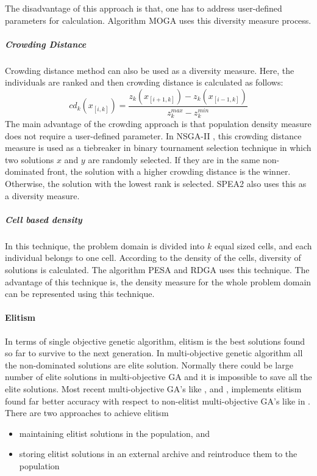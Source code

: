 The disadvantage of this approach is that, one has to address user-defined parameters for calculation. Algorithm MOGA\cite{moga} uses this diversity measure process.
\subparagraph {Crowding Distance}
Crowding distance method can also be used as a diversity measure. Here, the individuals are ranked and then crowding distance is calculated as follows: \[cd_k(x_{[i,k]}) = \frac {z_k(x_{[i+1,k]}) - z_k(x_{[i-1,k]})} {z_k^{max} - z_k^{min}}\]
The main advantage of the crowding approach is that population density measure does not require a user-defined parameter. In NSGA-II \cite{nsga2}, this crowding distance measure is used as a tiebreaker in binary tournament selection technique in which two solutions $x$ and $y$ are randomly selected. If they are in the same non-dominated front, the solution with a higher crowding distance is the winner. Otherwise, the solution with the lowest rank is selected. SPEA2 \cite{spea2} also uses this as a diversity measure.

\subparagraph {Cell based density}
In this technique, the problem domain is divided into $k$ equal sized cells, and each individual belongs to one cell. According to the density of the cells, diversity of solutions is calculated. The algorithm PESA \cite{pesa} and RDGA \cite{rdga} uses this technique. The advantage of this technique is, the density measure for the whole problem domain can be represented using this technique.

\paragraph {Elitism}
In terms of single objective genetic algorithm, elitism is the best solutions found so far to survive to the next generation. In multi-objective genetic algorithm all the non-dominated solutions are elite solution. Normally there could be large number of elite solutions in multi-objective GA and it is impossible to save all the elite solutions. Most recent multi-objective GA’s like \cite{spea}, \cite{deb} and \cite {stateart}, implements elitism found far better accuracy with respect to non-elitist multi-objective GA’s like in \cite {reduce}. There are two approaches to achieve elitism
\begin {itemize}
\item maintaining elitist solutions in the population, and
\item storing elitist solutions in an external archive and reintroduce them to the population
\end {itemize}

